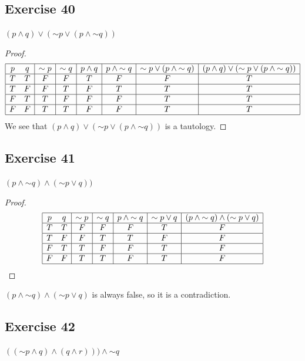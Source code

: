 \documentclass[14pt]{extarticle}
\begin{document}
\subsection{Exercise 40} $(p \wedge q) \vee ({\sim p} \vee (p \wedge {\sim q}))$
\begin{proof} $$ \begin{array}{|cc|c|c|c|c|c|c|} \hline p & q & {\sim p} & {\sim
q} & p \wedge q & p \wedge {\sim q} & {\sim p} \vee (p \wedge {\sim q}) & (p
\wedge q) \vee ({\sim p} \vee (p \wedge {\sim q})) \\ \hline T & T & F & F & T &
F & F & T \\ \hline T & F & F & T & F & T & T & T \\ \hline F & T & T & F & F &
F & T & T \\ \hline F & F & T & T & F & F & T & T \\ \hline \end{array} $$ We
see that $(p \wedge q) \vee ({\sim p} \vee (p \wedge {\sim q}))$ is a tautology.
\end{proof}

\subsection{Exercise 41} $(p \wedge {\sim q}) \wedge ({\sim p} \vee q))$
\begin{proof} $$ \begin{array}{|cc|c|c|c|c|c|} \hline p & q & {\sim p} & {\sim
q} & p \wedge {\sim q} & {\sim p} \vee q & (p \wedge {\sim q}) \wedge ({\sim p}
\vee q) \\ \hline T & T & F & F & F & T & F \\ \hline T & F & F & T & T & F & F
\\ \hline F & T & T & F & F & T & F \\ \hline F & F & T & T & F & T & F \\
\hline \end{array} $$ \end{proof} $(p \wedge {\sim q}) \wedge ({\sim p} \vee q)$
is always false, so it is a contradiction.


\subsection{Exercise 42} $(({\sim p} \wedge q) \wedge (q \wedge r))) \wedge
{\sim q}$
\end{document}
